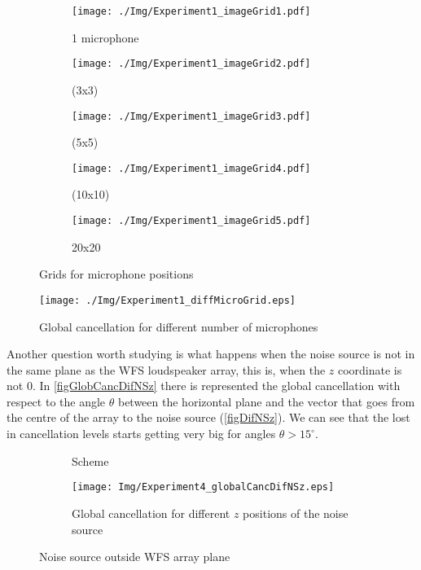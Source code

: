 \begin{figure}[H]
	\centering
	\begin{subfigure}[b]{0.3\textwidth}
		\centering
		\texttt{[image: ./Img/Experiment1\_imageGrid1.pdf]}
		\caption{1 microphone}
	\end{subfigure}
	\begin{subfigure}[b]{0.3\textwidth}
		\centering
		\texttt{[image: ./Img/Experiment1\_imageGrid2.pdf]}
		\caption{(3x3)}
	\end{subfigure}
	\begin{subfigure}[b]{0.3\textwidth}
		\centering
		\texttt{[image: ./Img/Experiment1\_imageGrid3.pdf]}
		\caption{(5x5)}
	\end{subfigure}
	\begin{subfigure}[b]{0.3\textwidth}
		\centering
		\texttt{[image: ./Img/Experiment1\_imageGrid4.pdf]}
		\caption{(10x10)}
	\end{subfigure}
	\begin{subfigure}[b]{0.3\textwidth}
		\centering
		\texttt{[image: ./Img/Experiment1\_imageGrid5.pdf]}
		\caption{20x20}
	\end{subfigure}
	\caption{Grids for microphone positions}
	\label{figGrids}
\end{figure}

\begin{figure}[H]
	\centering
	\texttt{[image: ./Img/Experiment1\_diffMicroGrid.eps]}
	\caption[Global cancellation for different number of microphones]{Global cancellation for different number of microphones}
	\label{figDiffMicroGridsCanc}
\end{figure}

Another question worth studying is what happens when the noise source is not in the same plane as the WFS loudspeaker array, this is, when the $z$ coordinate is not 0. In \autoref{figGlobCancDifNSz} there is represented the global cancellation with respect to the angle $\theta$ between the horizontal plane and the vector that goes from the centre of the array to the noise source (\autoref{figDifNSz}). We can see that the lost in cancellation levels starts getting very big for angles $\theta > 15^\circ$.

\begin{figure}[H]
	\centering
	\begin{subfigure}[b]{0.49\textwidth}
	\centering
	\def\svgwidth{\columnwidth}
	\graphicspath{{Img/}}
	
	\caption{Scheme}
	\label{figDifNSz}
	\end{subfigure}
	\begin{subfigure}[b]{0.49\textwidth}
	\centering
	\texttt{[image: Img/Experiment4\_globalCancDifNSz.eps]}
	\caption{Global cancellation for different $z$ positions of the noise source}
	\label{figGlobCancDifNSz}
\end{subfigure}
	\caption{Noise source outside WFS array plane}
\end{figure}


